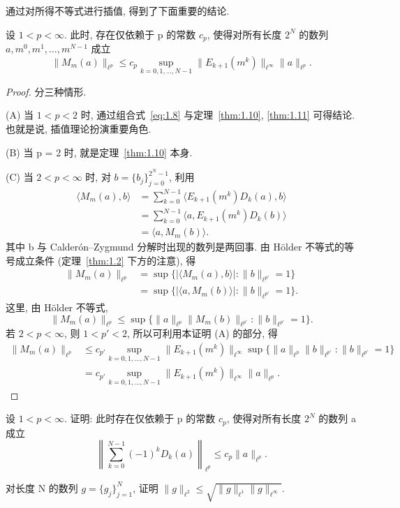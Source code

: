 通过对所得不等式进行插值, 得到了下面重要的结论.

\begin{theorem}\label{thm:1.12}
设 $1 < p < \infty$. 此时, 存在仅依赖于 p 的常数 $c_{p}$, 使得对所有长度 $2^{N}$ 的数列 $a, m^{0}, m^{1}, \ldots, m^{N-1}$ 成立
\[
\|M_{m}(a)\|_{\ell^{p}} \leq c_{p}\sup_{k=0,1,\ldots,N-1}\|E_{k+1}(m^{k})\|_{\ell^{\infty}}\|a\|_{\ell^{p}}.
\]
\end{theorem}

\begin{proof}
分三种情形.

(A) 当 $1 < p < 2$ 时, 通过组合式~\eqref{eq:1.8} 与定理~\ref{thm:1.10}, \ref{thm:1.11} 可得结论. 也就是说, 插值理论扮演重要角色.

(B) 当 p = 2 时, 就是定理~\ref{thm:1.10} 本身.

(C) 当 $2 < p < \infty$ 时, 对 $b = \{b_{j}\}_{j=0}^{2^{N}-1}$, 利用
\begin{align*}
\langle M_{m}(a), b \rangle &= \sum_{k=0}^{N-1}\langle E_{k+1}(m^{k})D_{k}(a), b \rangle \\
&= \sum_{k=0}^{N-1}\langle a, E_{k+1}(m^{k})D_{k}(b) \rangle \\
&= \langle a, M_{m}(b) \rangle.
\end{align*}
其中 b 与 Calderón--Zygmund 分解时出现的数列是两回事. 由 Hölder 不等式的等号成立条件 (定理~\ref{thm:1.2} 下方的注意), 得
\begin{align*}
\|M_{m}(a)\|_{\ell^{p}} &= \sup\{|\langle M_{m}(a), b \rangle| : \|b\|_{\ell^{p'}} = 1\} \\
&= \sup\{|\langle a, M_{m}(b) \rangle| : \|b\|_{\ell^{p'}} = 1\}.
\end{align*}
这里, 由 Hölder 不等式,
\[
\|M_{m}(a)\|_{\ell^{p}} \leq \sup\{\|a\|_{\ell^{p}}\|M_{m}(b)\|_{\ell^{p'}} : \|b\|_{\ell^{p'}} = 1\}.
\]
若 $2 < p < \infty$, 则 $1 < p' < 2$, 所以可利用本证明 (A) 的部分, 得
\begin{align*}
\|M_{m}(a)\|_{\ell^{p}} &\leq c_{p'}\sup_{k=0,1,\ldots,N-1}\|E_{k+1}(m^{k})\|_{\ell^{\infty}}\sup\{\|a\|_{\ell^{p}}\|b\|_{\ell^{p'}} : \|b\|_{\ell^{p'}} = 1\} \\
&= c_{p'}\sup_{k=0,1,\ldots,N-1}\|E_{k+1}(m^{k})\|_{\ell^{\infty}}\|a\|_{\ell^{p}}.
\end{align*}
\end{proof}

\begin{exercise}\label{exer:1.24}
设 $1 < p < \infty$. 证明: 此时存在仅依赖于 p 的常数 $c_{p}$, 使得对所有长度 $2^{N}$ 的数列 a 成立
\[
\left\|\sum_{k=0}^{N-1}(-1)^{k}D_{k}(a)\right\|_{\ell^{p}} \leq c_{p}\|a\|_{\ell^{p}}.
\]
\end{exercise}

\begin{exercise}\label{exer:1.25}
对长度 N 的数列 $g = \{g_{j}\}_{j=1}^{N}$, 证明 $\|g\|_{\ell^{2}} \leq \sqrt{\|g\|_{\ell^{1}}\|g\|_{\ell^{\infty}}}$.
\end{exercise}
